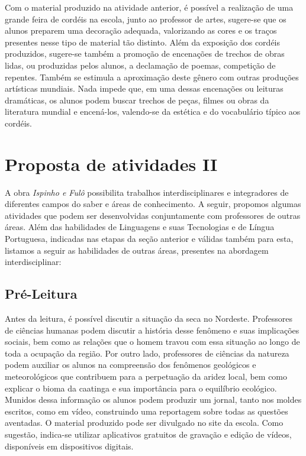 \documentclass[12pt]{extarticle}
\begin{document}
 Com o material produzido na atividade anterior, é possível a
realização de uma grande feira de cordéis na escola, junto ao professor
de artes, sugere-se que os alunos preparem uma decoração adequada,
valorizando as cores e os traços presentes nesse tipo de material tão
distinto. Além da exposição dos cordéis produzidos, sugere-se também a
promoção de encenações de trechos de obras lidas, ou produzidas pelos
alunos, a declamação de poemas, competição de repentes. Também se
estimula a aproximação deste gênero com outras produções artísticas
mundiais. Nada impede que, em uma dessas encenações ou leituras
dramáticas, os alunos podem buscar trechos de peças, filmes ou obras da
literatura mundial e encená-los, valendo-se da estética e do vocabulário
típico aos cordéis.

\section{Proposta de atividades II}
A obra \emph{Ispinho e Fulô} possibilita trabalhos interdisciplinares e
integradores de diferentes campos do saber e áreas de conhecimento. A
seguir, propomos algumas atividades que podem ser desenvolvidas
conjuntamente com professores de outras áreas. Além das habilidades de
Linguagens e suas Tecnologias e de Língua Portuguesa, indicadas nas
etapas da seção anterior e válidas também para esta, listamos a seguir
as habilidades de outras áreas, presentes na abordagem interdisciplinar:


\subsection{Pré-Leitura}

Antes da leitura, é possível discutir a situação da seca no
Nordeste. Professores de ciências humanas podem discutir a história
desse fenômeno e suas implicações sociais, bem como as relações que o
homem travou com essa situação ao longo de toda a ocupação da região.
Por outro lado, professores de ciências da natureza podem auxiliar os
alunos na compreensão dos fenômenos geológicos e meteorológicos que
contribuem para a perpetuação da aridez local, bem como explicar o bioma
da caatinga e sua importância para o equilíbrio ecológico. Munidos dessa
informação os alunos podem produzir um jornal, tanto nos moldes
escritos, como em vídeo, construindo uma reportagem sobre todas as
questões aventadas. O material produzido pode ser divulgado no site da
escola. Como sugestão, indica-se utilizar aplicativos gratuitos de
gravação e edição de vídeos, disponíveis em dispositivos digitais.
\end{document}
